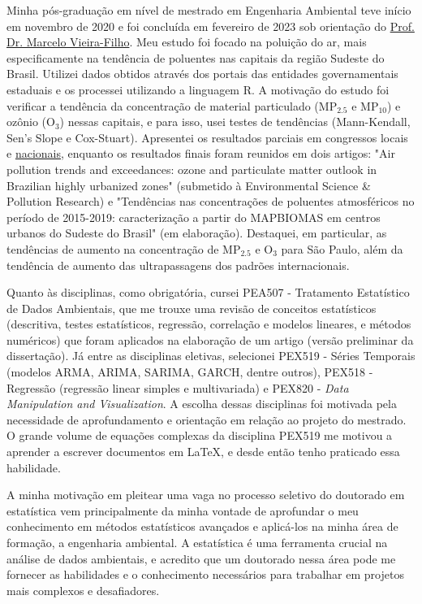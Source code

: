 \documentclass[12pt,a4paper]{article}
\begin{document}
	Minha pós-graduação em nível de mestrado em Engenharia Ambiental teve início em novembro de 2020 e foi concluída em fevereiro de 2023 sob orientação do \href{http://lattes.cnpq.br/5059318976988668}{Prof. Dr. Marcelo Vieira-Filho}. Meu estudo foi focado na poluição do ar, mais especificamente na tendência de poluentes nas capitais da região Sudeste do Brasil. Utilizei dados obtidos através dos portais das entidades governamentais estaduais e os processei utilizando a linguagem R. A motivação do estudo foi verificar a tendência da concentração de material particulado (MP$_{2.5}$ e MP$_{10}$) e ozônio (O$_3$) nessas capitais, e para isso, usei testes de tendências (Mann-Kendall, Sen's Slope e Cox-Stuart). Apresentei os resultados parciais em congressos locais e \href{http://www.meioambientepocos.com.br/ANAIS2022/76%20-%20244016_crescimento-da-concentrao-de-materiais-particulados-e-oznio-em-capitais-brasileiras.pdf}{nacionais}, enquanto os resultados finais foram reunidos em dois artigos: "Air pollution trends and exceedances: ozone and particulate matter outlook in Brazilian highly urbanized zones" (submetido à Environmental Science \& Pollution Research) e "Tendências nas concentrações de poluentes atmosféricos no período de 2015-2019: caracterização a partir do MAPBIOMAS em centros urbanos do Sudeste do Brasil" (em elaboração). Destaquei, em particular, as tendências de aumento na concentração de MP$_{2.5}$ e O$_3$ para São Paulo, além da tendência de aumento das ultrapassagens dos padrões internacionais.
	
	Quanto às disciplinas, como obrigatória, cursei PEA507 - Tratamento Estatístico de Dados Ambientais, que me trouxe uma revisão de conceitos estatísticos (descritiva, testes estatísticos, regressão, correlação e modelos lineares, e métodos numéricos) que foram aplicados na elaboração de um artigo (versão preliminar da dissertação). Já entre as disciplinas eletivas, selecionei PEX519 - Séries Temporais (modelos ARMA, ARIMA, SARIMA, GARCH, dentre outros), PEX518 - Regressão (regressão linear simples e multivariada) e PEX820 - \textit{Data Manipulation and Visualization}. A escolha dessas disciplinas foi motivada pela necessidade de aprofundamento e orientação em relação ao projeto do mestrado. O grande volume de equações complexas da disciplina PEX519 me motivou a aprender a escrever documentos em \LaTeX, e desde então tenho praticado essa habilidade.

	
	A minha motivação em pleitear uma vaga no processo seletivo do doutorado em estatística vem principalmente da minha vontade de aprofundar o meu conhecimento em métodos estatísticos avançados e aplicá-los na minha área de formação, a engenharia ambiental. A estatística é uma ferramenta crucial na análise de dados ambientais, e acredito que um doutorado nessa área pode me fornecer as habilidades e o conhecimento necessários para trabalhar em projetos mais complexos e desafiadores.
	
\end{document}
